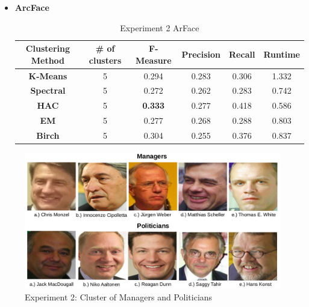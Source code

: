 \documentclass[12pt,english]{article}
\begin{document}
\begin{itemize}
\item \textbf{ArcFace}
\begin{table}[H]
\centering
\begin{tabular}{||c c c c c c||} 
 \hline
 Clustering Method & \# of clusters & F-Measure & Precision & Recall & Runtime\\ [0.5ex]
 \hline\hline
 \textbf{K-Means} & 5 & 0.294 & 0.283 & 0.306 & 1.332\\ 
 \hline
  \textbf{Spectral} & 5 & 0.272 & 0.262 & 0.283 & 0.742\\
 \hline
 \textbf{HAC} & 5 & \textbf{0.333} & 0.277 & 0.418 & 0.586\\
 \hline
 \textbf{EM} & 5 & 0.277 & 0.268 & 0.288 & 0.803\\
 \hline
 \textbf{Birch} & 5 & 0.304 & 0.255 & 0.376 & 0.837\\
 \hline
\end{tabular}
\caption{Experiment 2 ArFace}
\label{table:ex2arcface}
\end{table}
\end{itemize}

\begin{figure}[!tbp]
 \centering
    \includegraphics[width=\columnwidth]{figures/manager.png}
    \caption{Experiment 2: Cluster of Managers and Politicians}
    \label{fig:ex2tp}
\end{figure}
\end{document}

